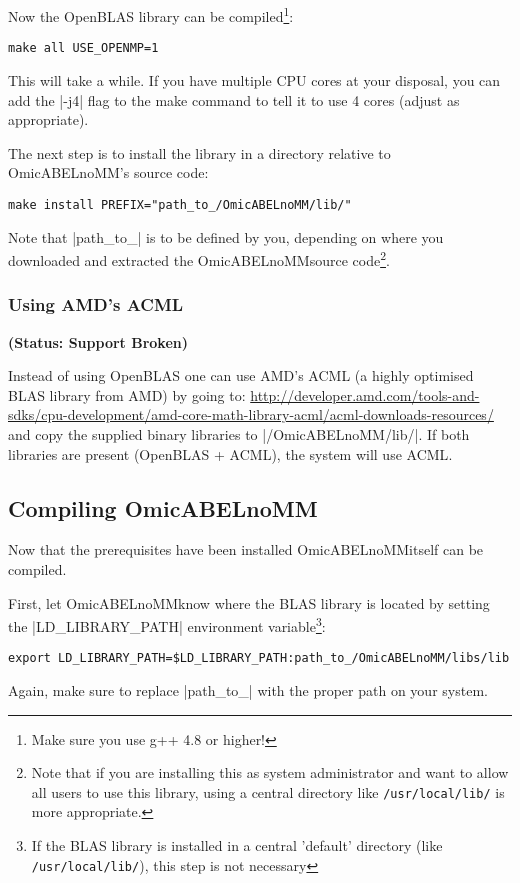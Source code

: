 \documentclass{report}
\newcommand{\oanomm}{OmicABELnoMM}
\begin{document}
Now the OpenBLAS library can be compiled\footnote{Make sure you use
  g++ 4.8 or higher!}:
\begin{lstlisting}[escapechar=\%]
make all USE_OPENMP=1
\end{lstlisting}
This will take a while. If you have multiple CPU cores at your
disposal, you can add the |-j4| flag to the make command to tell it to
use 4 cores (adjust as appropriate).

The next step is to install the library in a directory relative to
OmicABELnoMM's source code:
\begin{lstlisting}
make install PREFIX="path_to_/OmicABELnoMM/lib/"
\end{lstlisting}
Note that |path_to_| is to be defined by you, depending on where you
downloaded and extracted the \oanomm source code\footnote{Note that if
you are installing this as system administrator and want to allow all
users to use this library, using a central directory like
\lstinline{/usr/local/lib/} is more appropriate.}.

\subsubsection{Using AMD's \ac{ACML}}
\textbf{(Status: Support Broken)}

Instead of using OpenBLAS one can use AMD's \ac{ACML} (a highly optimised
\ac{BLAS} library from AMD) by going to:
\url{http://developer.amd.com/tools-and-sdks/cpu-development/amd-core-math-library-acml/acml-downloads-resources/}
and copy the supplied binary libraries to |/OmicABELnoMM/lib/|. If
both libraries are present (OpenBLAS + \ac{ACML}), the system will use
\ac{ACML}.


\subsection{Compiling \oanomm}
\label{sec:compiling-oanomm}
Now that the prerequisites have been installed \oanomm itself can be compiled.

First, let \oanomm know where the \ac{BLAS} library is located by
setting the |LD_LIBRARY_PATH| environment variable\footnote{If the
  \ac{BLAS} library is installed in a central 'default' directory
  (like \lstinline{/usr/local/lib/}), this step is not necessary}:
\begin{lstlisting}[escapechar=\%]
export LD_LIBRARY_PATH=$LD_LIBRARY_PATH:path_to_/OmicABELnoMM/libs/lib
\end{lstlisting}
Again, make sure to replace |path_to_| with the proper path on your system.
\end{document}

